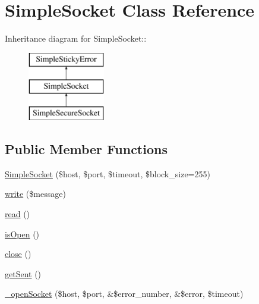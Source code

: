 \hypertarget{class_simple_socket}{
\section{SimpleSocket Class Reference}
\label{class_simple_socket}
}
Inheritance diagram for SimpleSocket::\begin{figure}[H]
\begin{center}
\leavevmode
\includegraphics[height=3cm]{class_simple_socket}
\end{center}
\end{figure}
\subsection*{Public Member Functions}
\begin{DoxyCompactItemize}
\item 
\hyperlink{class_simple_socket_a98655f28b53a14f44635556f57776c6f}{SimpleSocket} (\$host, \$port, \$timeout, \$block\_\-size=255)
\item 
\hyperlink{class_simple_socket_a0c8a3adc1d670b4af4caf7f3f5a054b9}{write} (\$message)
\item 
\hyperlink{class_simple_socket_a893956f7b624e6093f5e0ca51d024e3a}{read} ()
\item 
\hyperlink{class_simple_socket_a62784f70653974c9a2dc1f7f74af04a4}{isOpen} ()
\item 
\hyperlink{class_simple_socket_ad908752f647641818fa09c8277bd5b1c}{close} ()
\item 
\hyperlink{class_simple_socket_a81d45c8f467f9b1edb3eec81dfea3d18}{getSent} ()
\item 
\hyperlink{class_simple_socket_a40c391808591c437200a14ebb2619f83}{\_\-openSocket} (\$host, \$port, \&\$error\_\-number, \&\$error, \$timeout)
\end{DoxyCompactItemize}
